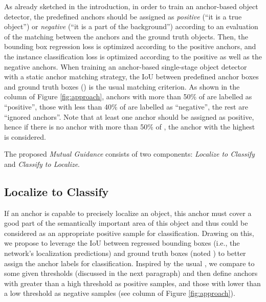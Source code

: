 \documentclass[runningheads]{llncs}
\begin{document}
As already sketched in the introduction, in order to train an anchor-based object detector, the predefined anchors should be assigned as \emph{positive} (``it is a true object'') or \emph{negative} (``it is a part of the background'') according to an evaluation of the matching between the anchors and the ground truth objects. Then, the bounding box regression loss is optimized according to the positive anchors, and the instance classification loss is optimized according to the positive as well as the negative anchors.
When training an anchor-based single-stage object detector with a static anchor matching strategy, the IoU between predefined anchor boxes and ground truth boxes () is the usual matching criterion.
As shown in the  column of Figure \ref{fig:approach}, anchors with more than 50\% of  are labelled as ``positive'', those with less than 40\% of  are labelled as ``negative'', the rest are ``ignored anchors''. Note that at least one anchor should be assigned as positive, hence if there is no anchor with more than 50\% of , the anchor with the highest  is considered.

The proposed \emph{Mutual Guidance} consists of two components: \emph{Localize to Classify} and \emph{Classify to Localize}.

\subsection{Localize to Classify}
\label{sec:approach_r2c}

If an anchor is capable to precisely localize an object, this anchor must cover a good part of the semantically important area of this object and thus could be considered as an appropriate positive sample for classification. Drawing on this, we propose to leverage the IoU between regressed bounding boxes (i.e., the network's localization predictions) and ground truth boxes (noted ) to better assign the anchor labels for classification.
Inspired by the usual , we compare  to some given thresholds (discussed in the next paragraph) and then define anchors with  greater than a high threshold as positive samples, and those with  lower than a low threshold as negative samples (see  column of Figure \ref{fig:approach}).
\end{document}
